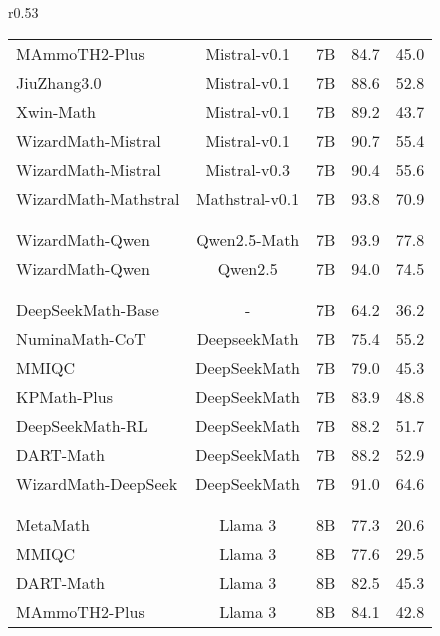 \begin{wraptable}{r}{0.53\textwidth}
{\begin{tabular}{lccll}
    MAmmoTH2-Plus~\citep{yue2024mammoth2} & Mistral-v0.1 & 7B & 84.7 & 45.0 \\  
    JiuZhang3.0~\citep{zhou2024jiuzhang3} & Mistral-v0.1 & 7B & 88.6 & 52.8 \\  
    Xwin-Math~\citep{li2024-Xwin-math} & Mistral-v0.1 & 7B & 89.2 & 43.7 \\  
    \rowcolor{gray!30}
    WizardMath-Mistral & Mistral-v0.1 & 7B & 90.7 & 55.4 \\  
    \rowcolor{gray!30}
    WizardMath-Mistral & Mistral-v0.3 & 7B & 90.4 & 55.6 \\  
    \rowcolor{gray!30}
    WizardMath-Mathstral & Mathstral-v0.1 & 7B & 93.8 & 70.9 \\  \\[-0.7em]  \hdashline \\[-0.7em]
    \rowcolor{gray!30}
    WizardMath-Qwen & Qwen2.5-Math & 7B & 93.9 & 77.8 \\  
    \rowcolor{gray!30}
    WizardMath-Qwen & Qwen2.5 & 7B & 94.0 & 74.5 \\  \\[-0.7em]  \hdashline \\[-0.7em]
    DeepSeekMath-Base~\citep{shao2024-deepseekmath} & - & 7B & 64.2 & 36.2 \\  
    NuminaMath-CoT~\citep{li2024-numinamath} & DeepseekMath & 7B & 75.4 & 55.2 \\  
    MMIQC~\citep{liu2024-MMIQC} & DeepSeekMath & 7B & 79.0 & 45.3 \\  
    KPMath-Plus~\citep{huang2024-KPMath} & DeepSeekMath & 7B & 83.9 & 48.8 \\  
    DeepSeekMath-RL~\citep{shao2024-deepseekmath} & DeepSeekMath & 7B & 88.2 & 51.7 \\  
    DART-Math~\citep{tong2024-DART} & DeepSeekMath & 7B & 88.2 & 52.9 \\ 
    \rowcolor{gray!30}
    WizardMath-DeepSeek & DeepSeekMath & 7B & 91.0 & 64.6 \\  \\[-0.7em]  \hdashline \\[-0.7em]
    MetaMath~\citep{yu2023metamath} & Llama 3 & 8B & 77.3 & 20.6 \\  
    MMIQC~\citep{liu2024-MMIQC} & Llama 3 & 8B & 77.6 & 29.5 \\  
    DART-Math~\citep{tong2024-DART} & Llama 3 & 8B & 82.5 & 45.3 \\   
    MAmmoTH2-Plus~\citep{yue2024mammoth2} & Llama 3 & 8B & 84.1 & 42.8 \\  

\end{tabular}}
\end{wraptable}
